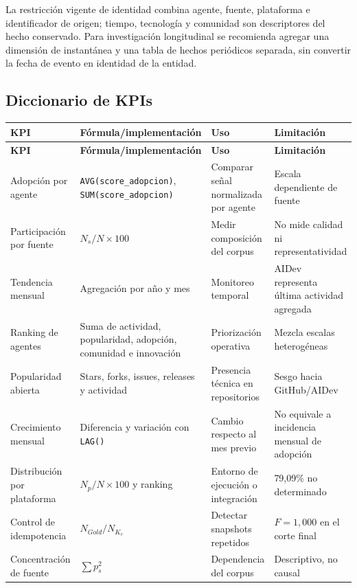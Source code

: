 \documentclass[12pt,a4paper]{article}
\newcommand{\pathcode}[1]{\begingroup\small\ttfamily\nolinkurl{#1}\endgroup}
\begin{document}
La restricción vigente de identidad combina agente, fuente, plataforma e identificador de origen; tiempo, tecnología y comunidad son descriptores del hecho conservado. Para investigación longitudinal se recomienda agregar una dimensión de instantánea y una tabla de hechos periódicos separada, sin convertir la fecha de evento en identidad de la entidad.

\subsection{Diccionario de KPIs}

\small
\begin{longtable}{P{3.1cm} P{4.2cm} P{4.2cm} P{2.6cm}}
\toprule
{}
\textbf{KPI} & \textbf{Fórmula/implementación} & \textbf{Uso} & \textbf{Limitación} \\
\midrule
\endfirsthead
\toprule
{}
\textbf{KPI} & \textbf{Fórmula/implementación} & \textbf{Uso} & \textbf{Limitación} \\
\midrule
\endhead
Adopción por agente & \pathcode{AVG(score_adopcion)}, \pathcode{SUM(score_adopcion)} & Comparar señal normalizada por agente & Escala dependiente de fuente \\
Participación por fuente & $N_s/N\times100$ & Medir composición del corpus & No mide calidad ni representatividad \\
Tendencia mensual & Agregación por año y mes & Monitoreo temporal & AIDev representa última actividad agregada \\
Ranking de agentes & Suma de actividad, popularidad, adopción, comunidad e innovación & Priorización operativa & Mezcla escalas heterogéneas \\
Popularidad abierta & Stars, forks, issues, releases y actividad & Presencia técnica en repositorios & Sesgo hacia GitHub/AIDev \\
Crecimiento mensual & Diferencia y variación con \pathcode{LAG()} & Cambio respecto al mes previo & No equivale a incidencia mensual de adopción \\
Distribución por plataforma & $N_p/N\times100$ y ranking & Entorno de ejecución o integración & 79,09\% no determinado \\
Control de idempotencia & $N_{Gold}/N_{K_e}$ & Detectar snapshots repetidos & $F=1,000$ en el corte final \\
Concentración de fuente & $\sum p_s^2$ & Dependencia del corpus & Descriptivo, no causal \\
\bottomrule
\end{longtable}
\normalsize
\end{document}
